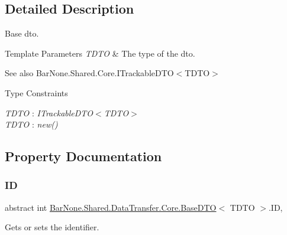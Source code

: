 \subsection{Detailed Description}
Base dto. 


\begin{DoxyTemplParams}{Template Parameters}
{\em T\+D\+TO} & The type of the dto.\\
\hline
\end{DoxyTemplParams}
\begin{DoxySeeAlso}{See also}
Bar\+None.\+Shared.\+Core.\+I\+Trackable\+D\+T\+O$<$\+T\+D\+T\+O$>$


\end{DoxySeeAlso}
\begin{Desc}
\item[Type Constraints]\begin{description}
\item[{\em T\+D\+TO} : {\em I\+Trackable\+D\+TO$<$T\+D\+TO$>$}]\item[{\em T\+D\+TO} : {\em new()}]\end{description}
\end{Desc}


\subsection{Property Documentation}
\mbox{\label{class_bar_none_1_1_shared_1_1_data_transfer_1_1_core_1_1_base_d_t_o_a16c72c2cd02c98dc7afa2983bb5f44bd}} 
\subsubsection{\texorpdfstring{ID}{ID}}
{\footnotesize\ttfamily abstract int \mbox{\hyperlink{class_bar_none_1_1_shared_1_1_data_transfer_1_1_core_1_1_base_d_t_o}{Bar\+None.\+Shared.\+Data\+Transfer.\+Core.\+Base\+D\+TO}}$<$ T\+D\+TO $>$.ID\hspace{0.3cm}{\ttfamily [get]}, {\ttfamily [set]}}



Gets or sets the identifier. 

